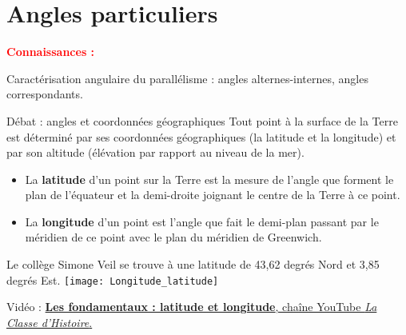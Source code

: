\graphicspath{{../../S02_Angles_particuliers/Images/}}

\themeG
\chapter{Angles particuliers}
\label{S02}


\textcolor{red}{\bf Connaissances :}
\begin{connaissances}
   \item Caractérisation angulaire du parallélisme : angles alternes-internes, angles correspondants.
\end{connaissances}

\vfill

\begin{debat}{Débat : angles et coordonnées géographiques}
   Tout point à la surface de la Terre est déterminé par ses coordonnées géographiques (la latitude et la longitude) et par son altitude (élévation par rapport au niveau de la mer). \par
   \begin{itemize}
      \item La {\bf latitude} d'un point sur la Terre est la mesure de l'angle que forment le plan de l'équateur et la demi-droite joignant le centre de la Terre à ce point.
      \item La {\bf longitude} d'un point est l'angle que fait le demi-plan passant par le méridien de ce point avec le plan du méridien de Greenwich.
   \end{itemize}
   Le collège Simone Veil se trouve à une latitude de 43,62 degrés Nord et 3,85 degrés Est.
   \tcblower
      \texttt{[image: Longitude\_latitude]}
\end{debat}

\hfill {\gray Vidéo : \href{https://www.youtube.com/watch?v=lpYEuHeecko}{{\bf Les fondamentaux : latitude et longitude}, chaîne YouTube {\it La Classe d'Histoire}.}}


